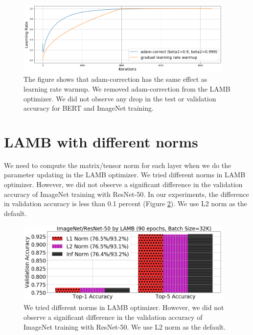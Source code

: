 \begin{figure}[tb]
\vspace{5pt}
\centering
\includegraphics[width=0.96\textwidth]{figs/adam_correct.png}
\caption{The figure shows that adam-correction has the same effect as learning rate warmup. We removed adam-correction from the LAMB optimizer. We did not observe any drop in the test or validation accuracy for BERT and ImageNet training.}
\label{fig:adam_correct}
\vspace{-10pt}
\end{figure}

\section{LAMB with different norms}
We need to compute the matrix/tensor norm for each layer when we do the parameter updating in the LAMB optimizer.
We tried different norms in LAMB optimizer. However, we did not observe a significant difference in the validation accuracy of ImageNet training with ResNet-50. In our experiments, the difference in validation accuracy is less than 0.1 percent (Figure \ref{fig:lamb_norm}). We use L2 norm as the default.

\begin{figure}[tb]
\vspace{5pt}
\centering
\includegraphics[width=0.96\textwidth]{figs/lamb_norm.png}
\caption{We tried different norms in LAMB optimizer. However, we did not observe a significant difference in the validation accuracy of ImageNet training with ResNet-50. We use L2 norm as the default.}
\label{fig:lamb_norm}
\vspace{-10pt}
\end{figure}

